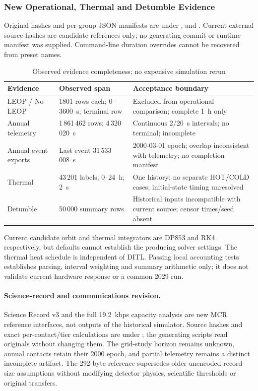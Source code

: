 \subsubsection{New Operational, Thermal and Detumble Evidence}\label{app:new-run-identities}
Original hashes and per-group JSON manifests are under ,  and . Current external source hashes are candidate references only; no generating commit or runtime manifest was supplied. Command-line duration overrides cannot be recovered from preset names.
\begin{table}[H]\centering\small
\caption{Observed evidence completeness; no expensive simulation rerun}\label{tab:new-run-completeness}
\begin{tabularx}{\linewidth}{@{}p{3cm}p{3.1cm}X@{}}\toprule
Evidence & Observed span & Acceptance boundary\\\midrule
LEOP / No-LEOP & 1801 rows each; 0--3600~s; terminal row & Excluded from operational comparison; complete 1~h only\\
Annual telemetry & 1\,861\,462 rows; 4\,320\,020~s & Continuous 2/20~s intervals; no terminal; incomplete\\
Annual event exports & Last event 31\,533\,008~s & 2000-03-01 epoch; overlap inconsistent with telemetry; no completion manifest\\
Thermal & 43\,201 labels; 0--24~h; 2~s & One history; no separate HOT/COLD cases; initial-state timing unresolved\\
Detumble & 50\,000 summary rows & Historical inputs incompatible with current source; censor times/seed absent\\\bottomrule
\end{tabularx}\end{table}
Current candidate orbit and thermal integrators are DP853 and RK4 respectively, but defaults cannot establish the producing solver settings. The thermal heat schedule is independent of DITL. Passing local accounting tests establishes parsing, interval weighting and summary arithmetic only; it does not validate current hardware response or a common 2029 run.

\paragraph{Science-record and communications revision.}
Science Record v3 and the full 19.2~kbps capacity analysis are new MCR reference interfaces, not outputs of the historical simulator. Source hashes and exact per-contact/tier calculations are under ; the generating scripts read originals without changing them. The grid-study horizon remains unknown, annual contacts retain their 2000 epoch, and partial telemetry remains a distinct incomplete artifact. The 292-byte reference supersedes older unencoded record-size assumptions without modifying detector physics, scientific thresholds or original transfers.
